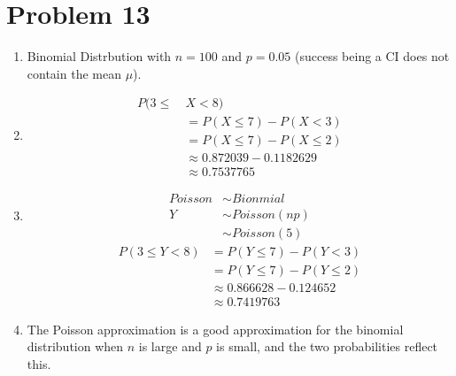 \documentclass{article}
\begin{document}
\section*{Problem 13}
\begin{enumerate}[label=(\alph*)]
    \item Binomial Distrbution with \(n = 100\) and \(p = 0.05\) (success being a CI does not contain the mean \(\mu\)).
    \item \begin{align*}
              P(3 \leq\  & X < 8)                       \\
                         & = P(X \leq 7) - P(X < 3)     \\
                         & = P(X \leq 7) - P(X \leq 2)  \\
                         & \approx 0.872039 - 0.1182629 \\
                         & \approx 0.7537765
          \end{align*}
    \item \begin{align*}
              Poisson & \sim Bionmial    \\
              Y       & \sim Poisson(np) \\
                      & \sim Poisson(5)
          \end{align*}
          \begin{align*}
              P(3 \leq Y < 8) & = P(Y \leq 7) - P(Y < 3)    \\
                              & = P(Y \leq 7) - P(Y \leq 2) \\
                              & \approx 0.866628 - 0.124652 \\
                              & \approx 0.7419763
          \end{align*}
    \item The Poisson approximation is a good approximation for the binomial distribution when \(n\) is large and \(p\) is small, and the two probabilities reflect this.
\end{enumerate}
\pagebreak
\end{document}
